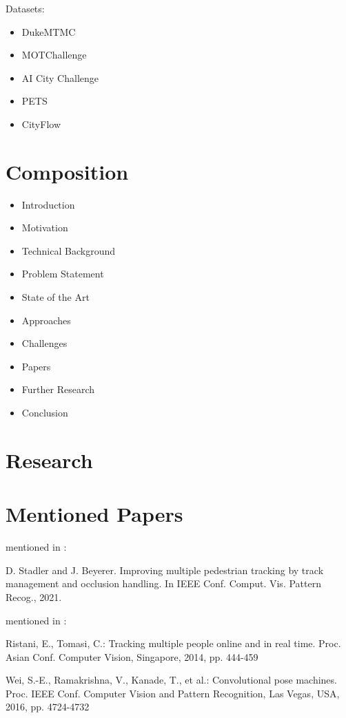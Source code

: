 Datasets:
\begin{itemize}
    \item DukeMTMC
    \item MOTChallenge
    \item AI City Challenge
    \item PETS
    \item CityFlow
\end{itemize}

\section{Composition}

\begin{itemize}
    \item Introduction
    \item Motivation
    \item Technical Background
    \item Problem Statement
    \item State of the Art
    \item Approaches
    \item Challenges
    \item Papers
    \item Further Research
    \item Conclusion
\end{itemize}


\section{Research}

\section{Mentioned Papers}

mentioned in \cite{Specker21}:

D. Stadler and J. Beyerer. Improving multiple pedestrian tracking by track management and occlusion handling. In IEEE Conf. Comput. Vis. Pattern Recog., 2021.

mentioned in \cite{Yoon18}:

Ristani, E., Tomasi, C.: Tracking multiple people online and in real time. Proc. Asian Conf. Computer Vision, Singapore, 2014, pp. 444-459

Wei, S.-E., Ramakrishna, V., Kanade, T., et al.: Convolutional pose machines. Proc. IEEE Conf. Computer Vision and Pattern Recognition, Las Vegas, USA, 2016, pp. 4724-4732

